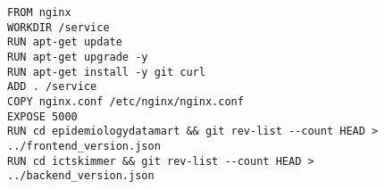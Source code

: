 \begin{verbatim}
FROM nginx
WORKDIR /service
RUN apt-get update
RUN apt-get upgrade -y
RUN apt-get install -y git curl
ADD . /service
COPY nginx.conf /etc/nginx/nginx.conf
EXPOSE 5000
RUN cd epidemiologydatamart && git rev-list --count HEAD > ../frontend_version.json
RUN cd ictskimmer && git rev-list --count HEAD > ../backend_version.json
\end{verbatim}